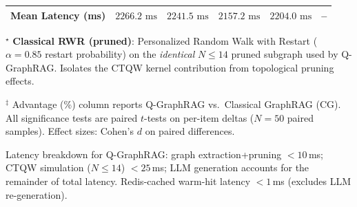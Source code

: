 \begin{table}[t]
\begin{tabular}{lccccl}
\midrule
Mean Latency (ms)
  & $2266.2\text{ ms}$
  & $2241.5\text{ ms}$
  & $2157.2\text{ ms}$
  & $2204.0\text{ ms}$
  & -- \\
\bottomrule
\end{tabular}
\begin{tablenotes}[flushleft]\small
\item $^\star$ \textbf{Classical RWR (pruned)}: Personalized Random Walk with Restart
  ($\alpha=0.85$ restart probability) on the \emph{identical} $N\leq14$ pruned subgraph
  used by Q-GraphRAG. Isolates the CTQW kernel contribution from topological pruning effects.
\item $^\ddagger$ Advantage (\%) column reports Q-GraphRAG vs.\ Classical GraphRAG (CG).
  All significance tests are paired $t$-tests on per-item deltas ($N=50$ paired samples).
  Effect sizes: Cohen's $d$ on paired differences.
\item Latency breakdown for Q-GraphRAG: graph extraction+pruning $<10$\,ms;
  CTQW simulation ($N\leq14$) $<25$\,ms; LLM generation accounts for the remainder of total latency.
  Redis-cached warm-hit latency $<1$\,ms (excludes LLM re-generation).
\end{tablenotes}
\end{table}
